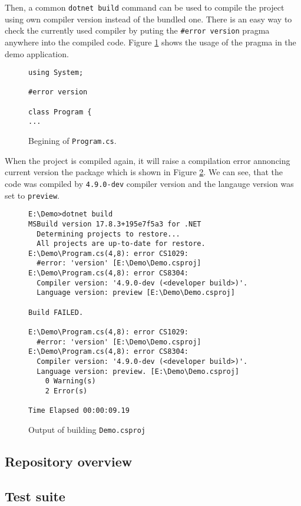 \par
Then, a common \texttt{dotnet build} command can be used to compile the project using own compiler version instead of the bundled one.
There is an easy way to check the currently used compiler by puting the \texttt{\#error version} pragma anywhere into the compiled code.
Figure \ref{img66:pragma} shows the usage of the pragma in the demo application.
\begin{figure}[h]
\begin{lstlisting}
using System;

#error version

class Program {
...
\end{lstlisting}
\caption{Begining of \texttt{Program.cs}.}
\label{img66:pragma}
\end{figure}
\par
When the project is compiled again, it will raise a compilation error annoncing current version the package which is shown in Figure \ref{img67:output}.
We can see, that the code was compiled by \texttt{4.9.0-dev} compiler version and the langauge version was set to \texttt{preview}. 
\begin{figure}[h]
\begin{lstlisting}
E:\Demo>dotnet build
MSBuild version 17.8.3+195e7f5a3 for .NET
  Determining projects to restore...
  All projects are up-to-date for restore.
E:\Demo\Program.cs(4,8): error CS1029: 
  #error: 'version' [E:\Demo\Demo.csproj]
E:\Demo\Program.cs(4,8): error CS8304: 
  Compiler version: '4.9.0-dev (<developer build>)'. 
  Language version: preview [E:\Demo\Demo.csproj]

Build FAILED.

E:\Demo\Program.cs(4,8): error CS1029: 
  #error: 'version' [E:\Demo\Demo.csproj]
E:\Demo\Program.cs(4,8): error CS8304: 
  Compiler version: '4.9.0-dev (<developer build>)'. 
  Language version: preview. [E:\Demo\Demo.csproj]
    0 Warning(s)
    2 Error(s)

Time Elapsed 00:00:09.19
\end{lstlisting}
\caption{Output of building \texttt{Demo.csproj}}
\label{img67:output}
\end{figure}

\subsection{Repository overview}


\subsection{Test suite}

